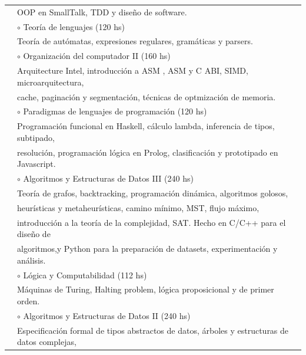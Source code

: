 \documentclass{article}
\newcommand{\shade}[1]{\textcolor{myGray}{#1}}
\begin{document}
\begin{longtable}{l l}
                    & \indent \shade{OOP en SmallTalk, TDD y diseño de software.} \\
                    & $\circ$ Teoría de lenguajes \shade{(120 hs)} \\
                    & \indent \shade{Teoría de autómatas, expresiones regulares, gramáticas y parsers.} \\
                    & $\circ$ Organización del computador II \shade{(160 hs)} \\
                    & \indent \shade{Arquitecture Intel, introducción a ASM , ASM y C ABI, SIMD, microarquitectura,} \\
                    & \indent \shade{cache, paginación y segmentación, técnicas de optmización de memoria.} \\
                    & $\circ$ Paradigmas de lenguajes de programación \shade{(120 hs)} \\
                    & \indent \shade{Programación funcional en Haskell, cálculo lambda, inferencia de tipos, subtipado,}  \\
                    & \indent \shade{resolución, programación lógica en Prolog, clasificación y prototipado en Javascript.} \\
                    & $\circ$ Algoritmos y Estructuras de Datos III \shade{(240 hs)} \\
                    & \indent \shade{Teoría de grafos, backtracking, programación dinámica, algoritmos golosos,} \\
                    & \indent \shade{heurísticas y metaheurísticas, camino mínimo, MST, flujo máximo,} \\
                    & \indent \shade{introducción a la teoría de la complejidad, SAT. Hecho en C/C++ para el diseño de} \\
                    & \indent \shade{ algoritmos,y Python para la preparación de datasets, experimentación y análisis.} \\
                    & $\circ$ Lógica y Computabilidad \shade{(112 hs)} \\
                    & \indent \shade{Máquinas de Turing, Halting problem, lógica proposicional y de primer orden.} \\
                    & $\circ$ Algoritmos y Estructuras de Datos II \shade{(240 hs)} \\
                    & \indent \shade{Especificación formal de tipos abstractos de datos, árboles y estructuras de datos complejas,} \\

\end{longtable}
\end{document}
